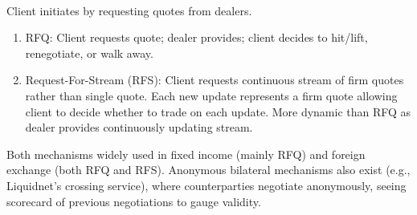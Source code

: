 \begin{definition} \\
Client initiates by requesting quotes from dealers.
\begin{enumerate}[label=\roman*.]
\setlength{\itemsep}{0pt}
\item RFQ: Client requests quote; dealer provides; client decides to hit/lift, renegotiate, or walk away.
\item Request-For-Stream (RFS): Client requests continuous stream of firm quotes rather than single quote. Each new update represents a firm quote allowing client to decide whether to trade on each update. More dynamic than RFQ as dealer provides continuously updating stream.
\end{enumerate}
Both mechanisms widely used in fixed income (mainly RFQ) and foreign exchange (both RFQ and RFS). Anonymous bilateral mechanisms also exist (e.g., Liquidnet's crossing service), where counterparties negotiate anonymously, seeing scorecard of previous negotiations to gauge validity.
\end{definition}

